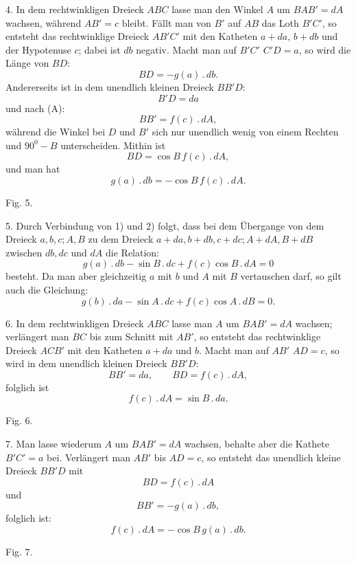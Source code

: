 %
4. In dem rechtwinkligen Dreieck $ABC$ lasse man den Winkel $A$ um $BAB' = dA$
wachsen, während $AB' = c$ bleibt. Fällt man von $B'$ auf $AB$ das Loth $B'C'$, so
entsteht das rechtwinklige Dreieck $AB'C'$ mit den Katheten $a+da$, $b+db$ und der
Hypotenuse $c$; dabei ist $db$ negativ. Macht man auf $B'C'$ $C'D = a$, so wird die
Länge von $BD$:
\[
BD = -g(a) \,.\, db.
\]
Andererseits ist in dem unendlich kleinen Dreieck $BB'D$:
\[
B'D = da
\]
und nach (A):
\[
BB' = f(c) \,.\, dA,
\]
während die Winkel bei $D$ und $B'$ sich nur unendlich wenig von einem Rechten und
$90^{0} - B$ unterscheiden. Mithin ist
\[
BD = \cos B\, f(c) \,.\, dA,
\]
und man hat
\[
\tag*{2)} g(a) \,.\, db = -\cos B\, f(c) \,.\, dA.
\]

\begin{center}\begin{minipage}{\linewidth}\centering


Fig. 5.
\end{minipage}\end{center}

5. Durch Verbindung von 1) und 2) folgt, dass bei dem Übergange von dem Dreieck
$a, b, c; A, B$ zu dem Dreieck $a+da, b+db, c+dc; A+dA, B+dB$ zwischen $db, dc$ und
$dA$ die Relation:
\[
\tag*{I.} g(a) \,.\, db - \sin B \,.\, dc + f(c) \cos B \,.\, dA = 0
\]
besteht. Da man aber gleichzeitig $a$ mit $b$ und $A$ mit $B$ vertauschen darf, so
gilt auch die Gleichung:
\[
\tag*{II.} g(b) \,.\, da - \sin A \,.\, dc + f(c) \cos A \,.\, dB = 0.
\]

6. In dem rechtwinkligen Dreieck $ABC$ lasse man $A$ um $BAB' = dA$ wachsen;
verlängert man $BC$ bis zum Schnitt mit $AB'$, so entsteht das rechtwinklige
Dreieck $ACB'$ mit den Katheten $a+da$ und $b$. Macht man auf $AB'$ $AD = c$, so
wird in dem unendlich kleinen Dreieck $BB'D$:
\[
BB' = da, \qquad BD = f(c) \,.\, dA,
\]
folglich ist
\[
\tag*{3)} f(c) \,.\, dA = \sin B \,.\, da.
\]

\begin{center}\begin{minipage}{\linewidth}\centering


Fig. 6.
\end{minipage}\end{center}

7. Man lasse wiederum $A$ um $BAB' = dA$ wachsen, behalte aber die Kathete
$B'C' = a$ bei. Verlängert man $AB'$ bis $AD = c$, so entsteht das unendlich kleine
Dreieck $BB'D$ mit
\[
BD = f(c) \,.\, dA
\]
und
\[
BB' = -g(a) \,.\, db,
\]
folglich ist:
\[
\tag*{4)} f(c) \,.\, dA = -\cos B\, g(a) \,.\, db.
\]

\begin{center}\begin{minipage}{\linewidth}\centering


Fig. 7.
\end{minipage}\end{center}
